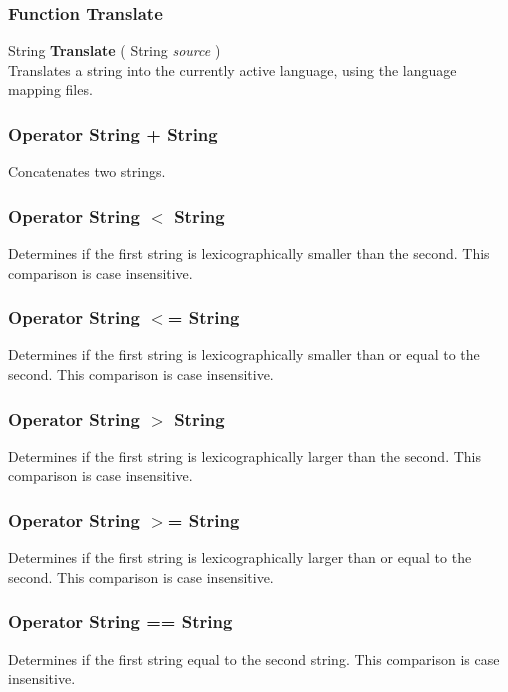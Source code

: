 \subsubsection{Function Translate \label{F:Translate}}
String \textbf{Translate} ( String \textit{source} ) \\
Translates a string into the currently active language, using the language mapping files.

\subsubsection{Operator String + String \label{O:String+String}}
Concatenates two strings.

\subsubsection{Operator String $<$ String \label{O:String<String}}
Determines if the first string is lexicographically smaller than the second. This comparison is case insensitive.

\subsubsection{Operator String $<$= String \label{O:String<=String}}
Determines if the first string is lexicographically smaller than or equal to the second. This comparison is case insensitive.

\subsubsection{Operator String $>$ String \label{O:String>String}}
Determines if the first string is lexicographically larger than the second. This comparison is case insensitive.

\subsubsection{Operator String $>$= String \label{O:String>=String}}
Determines if the first string is lexicographically larger than or equal to the second. This comparison is case insensitive.

\subsubsection{Operator String == String \label{O:String==String}}
Determines if the first string equal to the second string. This comparison is case insensitive.

